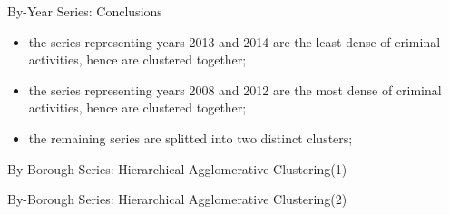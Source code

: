 \documentclass[12pt]{beamer}
\begin{document}
        \begin{frame}{By-Year Series: Conclusions}
            \begin{itemize}
                \item the series representing years 2013 and 2014 are the least dense of criminal
                activities, hence are clustered together;
                \item the series representing years 2008 and 2012 are the most dense of criminal activities,
                hence are clustered together;
                \item the remaining series are splitted into two distinct clusters;
            \end{itemize}
        \end{frame}

        \begin{frame}{By-Borough Series: Hierarchical Agglomerative Clustering(1)}
            \begin{figure}
                \centering
            \end{figure}
        \end{frame}

        \begin{frame}{By-Borough Series: Hierarchical Agglomerative Clustering(2)}
            \begin{figure}
                \centering
            \end{figure}
        \end{frame}
\end{document}
